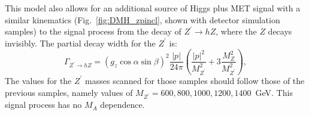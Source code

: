  This model also allows for an additional source of Higgs plus MET signal with a similar kinematics (Fig.~\ref{fig:DMH_zpincl}, shown with detector simulation 
 samples) to the signal process from the decay of $Z^\prime \to h Z$, where the $Z$ decays invisibly. The partial decay width for the $Z^\prime$ is:
 \begin{equation}
 \Gamma_{Z^\prime \to hZ}  = (g_z \cos \alpha \sin \beta)^2 \frac{|p|}{24 \pi} \left( \frac{ |p|^2 }{M_{Z^\prime}^2} + 3 \frac{M_Z^2}{M_{Z^\prime}^2} \right),
 \end{equation}
The values for the $Z^\prime$ masses scanned for those samples should follow those of the previous samples, 
namely values of $M_{Z^\prime}=600, 800, 1000, 1200, 1400$~GeV.  This signal process has no $M_A$ dependence. 
 
\begin{figure}[h!]
  	\centering
  	\hfill
  	\hfill
\end{figure}
